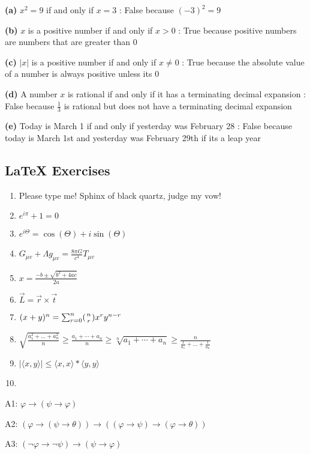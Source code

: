 \documentclass{article}
\begin{document}
\textbf{(a) } $x^2 = 9$ if and only if $x = 3$ : False because $ ( -3) ^2 = 9$

\textbf{(b) } $x$ is a positive number if and only if $x > 0$ : True because positive numbers are numbers that are greater than 0

\textbf{(c) } $\left\lvert x\right\rvert $ is a positive number if and only if $x \neq  0$ : True because the absolute value of a number is always positive unless its 0

\textbf{(d) } A number $x$ is rational if and only if it has a terminating decimal expansion : False because $\frac{1}{3}$ is rational but does not have a terminating decimal expansion

\textbf{(e) } Today is March 1 if and only if yesterday was February 28 : False because today is March 1st and yesterday was February 29th if its a leap year

\subsection*{\LaTeX{} Exercises}
\begin{enumerate}
    \item Please type me! Sphinx of black quartz, judge my vow!
    \item $e^{i\pi} + 1 = 0$
    \item $e^{i\Theta} = \cos(\Theta) + i\sin(\Theta)$
    \item $G_{\mu{}v}+\Lambda{}g_{\mu{}v} = \frac{8\pi{}G}{c^4}T_{\mu{}v}$ 
    \item $x = \frac{-b\pm{}\sqrt{b^2+4ac} }{2a}$
    \item $\overrightarrow{L}=\overrightarrow{r}\times \overrightarrow{t}$
    \item $( x+y ) ^n=\sum_{r = 0}^{n}( \genfrac{}{}{0px}{}{n}{r}) x^r y^{n-r}$
    \item $\sqrt{\frac{a_1^2+\dots+a_n^2}{n}} \geq \frac{a_1+\cdots+a_n}{n} \geq \sqrt[n]{a_1+\cdots+a_n} \geq \frac{n}{\frac{1}{a_1}+\dots+\frac{1}{a_n}}$
    \item $ \left\lvert \langle x , y\rangle \right\rvert \leq \langle x,x\rangle * \langle y,y\rangle $
    \item 
\end{enumerate}
A1: $\varphi \longrightarrow  ( \psi \rightarrow \varphi) $

A2: $( \varphi \longrightarrow  ( \psi \rightarrow \theta) ) \longrightarrow ( ( \varphi \rightarrow \psi) \longrightarrow ( \varphi \rightarrow \theta ) )$

A3: $( \lnot \varphi \rightarrow \lnot \psi) \longrightarrow ( \psi \rightarrow \varphi) $
\end{document}
